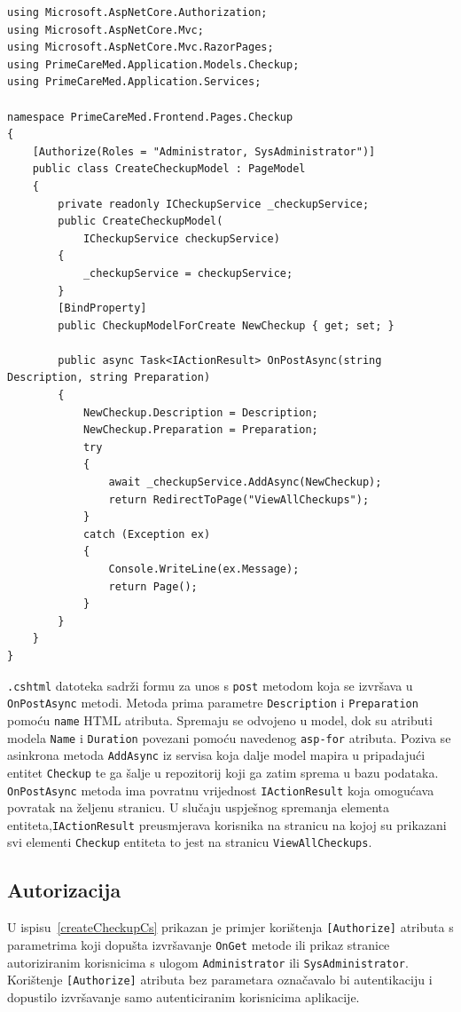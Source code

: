 \begin{lstlisting}[caption={\texttt{CreateCheckup.cshtml.cs} datoteka}, label=createCheckupCs]
using Microsoft.AspNetCore.Authorization;
using Microsoft.AspNetCore.Mvc;
using Microsoft.AspNetCore.Mvc.RazorPages;
using PrimeCareMed.Application.Models.Checkup;
using PrimeCareMed.Application.Services;

namespace PrimeCareMed.Frontend.Pages.Checkup
{
    [Authorize(Roles = "Administrator, SysAdministrator")]
    public class CreateCheckupModel : PageModel
    {
        private readonly ICheckupService _checkupService;
        public CreateCheckupModel(
            ICheckupService checkupService)
        {
            _checkupService = checkupService;
        }
        [BindProperty]
        public CheckupModelForCreate NewCheckup { get; set; }

        public async Task<IActionResult> OnPostAsync(string Description, string Preparation)
        {
            NewCheckup.Description = Description;
            NewCheckup.Preparation = Preparation;
            try
            {
                await _checkupService.AddAsync(NewCheckup);
                return RedirectToPage("ViewAllCheckups");
            }
            catch (Exception ex)
            {
                Console.WriteLine(ex.Message);
                return Page();
            }   
        }
    }
}
\end{lstlisting}

\texttt{.cshtml} datoteka sadrži formu za unos s \texttt{post} metodom koja se izvršava u \texttt{OnPostAsync} metodi. Metoda prima parametre \texttt{Description} i \texttt{Preparation} pomoću \texttt{name} HTML atributa. Spremaju se odvojeno u model, dok su atributi modela \texttt{Name} i \texttt{Duration} povezani pomoću navedenog \texttt{asp-for} atributa. Poziva se asinkrona metoda \texttt{AddAsync} iz servisa koja dalje model mapira u pripadajući entitet \texttt{Checkup} te ga šalje u repozitorij koji ga zatim sprema u bazu podataka. \texttt{OnPostAsync} metoda ima povratnu vrijednost \texttt{IActionResult} koja omogućava povratak na željenu stranicu. U slučaju uspješnog spremanja elementa entiteta,\texttt{IActionResult} preusmjerava korisnika na stranicu na kojoj su prikazani svi elementi \texttt{Checkup} entiteta to jest na stranicu \texttt{ViewAllCheckups}.

\subsection{Autorizacija}
U ispisu~\ref{createCheckupCs} prikazan je primjer korištenja \texttt{[Authorize]} atributa s parametrima koji dopušta izvršavanje \texttt{OnGet} metode ili prikaz stranice autoriziranim korisnicima s ulogom \texttt{Administrator} ili \texttt{SysAdministrator}. Korištenje \texttt{[Authorize]} atributa bez parametara označavalo bi autentikaciju i dopustilo izvršavanje samo autenticiranim korisnicima aplikacije.